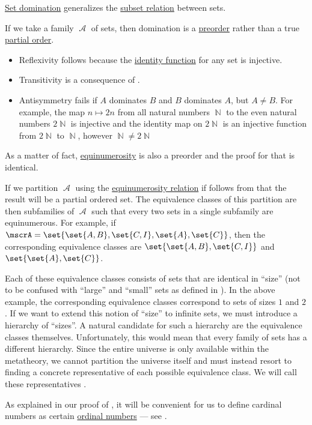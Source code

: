 \begin{remark}\label{rem:cardinal_definition}
  \hyperref[def:equinumerosity]{Set domination} generalizes the \hyperref[def:subset]{subset relation} between sets.

  If we take a family \( \mscrA \) of sets, then domination is a \hyperref[def:preordered_set]{preorder} rather than a true \hyperref[def:partially_ordered_set]{partial order}.
  \begin{itemize}
    \item Reflexivity follows because the \hyperref[def:set_valued_map/identity]{identity function} for any set is injective.
    \item Transitivity is a consequence of .
    \item Antisymmetry fails if \( A \) dominates \( B \) and \( B \) dominates \( A \), but \( A \neq B \). For example, the map \( n \mapsto 2n \) from all natural numbers \( \BbbN \) to the even natural numbers \( 2\BbbN \) is injective and the identity map on \( 2\BbbN \) is an injective function from \( 2\BbbN \) to \( \BbbN \), however \( \BbbN \neq 2\BbbN \)
  \end{itemize}

  As a matter of fact, \hyperref[def:equinumerosity]{equinumerosity} is also a preorder and the proof for that is identical.

  If we partition \( \mscrA \) using the \hyperref[def:equinumerosity]{equinumerosity relation} if follows from  that the result will be a partial ordered set. The equivalence classes of this partition are then subfamilies of \( \mscrA \) such that every two sets in a single subfamily are equinumerous. For example, if \( \mscrA = \set{ \set{ A, B }, \set{ C, I }, \set{ A }, \set{ C } } \), then the corresponding equivalence classes are \( \set{ \set{ A, B }, \set{ C, I } } \) and \( \set{ \set{ A }, \set{ C } } \).

  Each of these equivalence classes consists of sets that are identical in \enquote{size} (not to be confused with \enquote{large} and \enquote{small} sets as defined in ). In the above example, the corresponding equivalence classes correspond to sets of sizes \( 1 \) and \( 2 \). If we want to extend this notion of \enquote{size} to infinite sets, we must introduce a hierarchy of \enquote{sizes}. A natural candidate for such a hierarchy are the equivalence classes themselves. Unfortunately, this would mean that every family of sets has a different hierarchy. Since the entire universe is only available within the metatheory, we cannot partition the universe itself and must instead resort to finding a concrete representative of each possible equivalence class. We will call these representatives .

  As explained in our proof of , it will be convenient for us to define cardinal numbers as certain \hyperref[def:ordinal]{ordinal numbers} --- see .
\end{remark}

